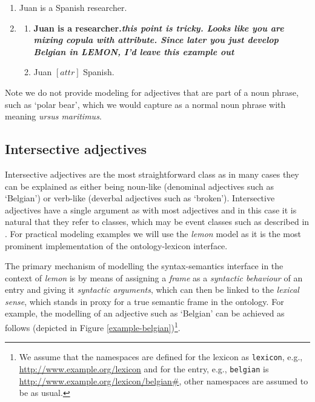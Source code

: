 \documentclass[11pt]{article}
\begin{document}
\begin{enumerate}[resume]
\item Juan is a Spanish researcher. \label{ex:juan}
\item \begin{enumerate}
\item \textbf{Juan is a researcher.\textit{this point is tricky. Looks like you are mixing copula with attribute. Since later you just develop Belgian in LEMON, I'd leave this example out}}
\item Juan $[attr]$ Spanish.
\end{enumerate}
\label{ex:juan_frames}
\end{enumerate}

Note we do not provide modeling for adjectives that are part of a noun phrase,
such as `polar bear', which we would capture as a normal noun phrase with 
meaning \emph{ursus maritimus}.

\subsection{Intersective adjectives}

Intersective adjectives are the most straightforward class as in many cases they 
can be explained as either being noun-like (denominal adjectives such as 
`Belgian') or verb-like (deverbal adjectives such as `broken'). Intersective 
adjectives have a single argument as with most adjectives and in this case it is 
natural that they refer to classes, which may be event classes such as described 
in \cite{mccrae2014design}. For practical modeling examples we will use the
\emph{lemon} model as it is the most prominent implementation of the 
ontology-lexicon interface.

The primary mechanism of modelling the syntax-semantics interface in the context 
of \emph{lemon} is by means of assigning a \emph{frame} as a \emph{syntactic 
behaviour} of an entry and giving it \emph{syntactic arguments}, which can then 
be linked to the \emph{lexical sense}, which stands in proxy for a true semantic 
frame in the ontology. For example, the modelling of an adjective such as 
`Belgian' can be achieved as follows (depicted in Figure 
\ref{example-belgian})\footnote{We assume that the namespaces are defined for 
the lexicon as {\tt lexicon}, e.g., \url{http://www.example.org/lexicon}
and for the entry, e.g., {\tt belgian} is \url{http://www.example.org/lexicon/belgian#},
other namespaces are assumed to be as usual.}.
\end{document}
